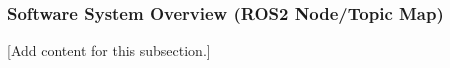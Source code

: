 
\subsubsection{Software System Overview (ROS2 Node/Topic Map)}
\label{subsubsec:design_7_1_software_system_overview}

[Add content for this subsection.]
